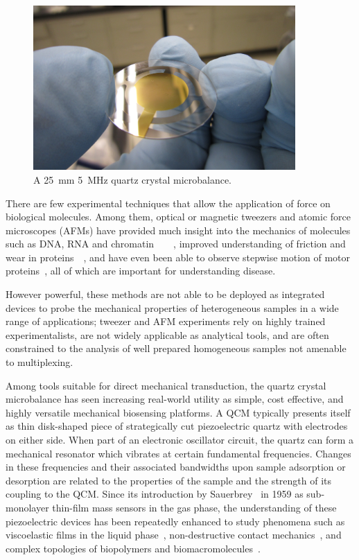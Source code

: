 \begin{figure}[ht]
 \centering
 \includegraphics[keepaspectratio,width=10cm]{qcm/figures/qcm_holding.jpg}
 \caption{A \SI{25}{\milli\meter} \SI{5}{\mega\hertz} quartz crystal microbalance.}
 \label{fig:qcmholding}
\end{figure}
There are few experimental techniques that allow the application of force
on biological molecules. Among them, optical or magnetic tweezers and
atomic force microscopes (AFMs) have provided much insight into the
mechanics of molecules such as DNA, RNA and
chromatin~\cite{felsenfeld1992chromatin}~\cite{cui2000pulling}~\cite{larson2012trigger}~\cite{marko1995stretching},
improved understanding of friction and wear in
proteins~\cite{suda2001origin}~\cite{bormuth2009protein}, and have even
been able to observe stepwise motion of motor
proteins~\cite{asbury2003kinesin}, all of which are important for
understanding disease.

However powerful, these methods are not able to be deployed as integrated
devices to probe the mechanical properties of heterogeneous samples in a
wide range of applications; tweezer and AFM experiments rely on highly
trained experimentalists, are not widely applicable as analytical tools,
and are often constrained to the analysis of well prepared homogeneous
samples not amenable to multiplexing.

Among tools suitable for direct mechanical transduction, the quartz crystal
microbalance has seen increasing real-world utility as simple, cost
effective, and highly versatile mechanical biosensing platforms. A QCM
typically presents itself as thin disk-shaped piece of strategically cut
piezoelectric quartz with electrodes on either side. When part of an
electronic oscillator circuit, the quartz can form a mechanical resonator
which vibrates at certain fundamental frequencies. Changes in these frequencies
and their associated bandwidths upon sample adsorption or desorption are
related to the properties of the sample and the strength of its coupling to
the QCM. Since its introduction by Sauerbrey~\cite{sauerbrey1959verwendung}
in 1959 as sub-monolayer thin-film mass sensors in the gas phase, the
understanding of these piezoelectric devices has been repeatedly enhanced
to study phenomena such as viscoelastic films in the liquid
phase~\cite{kanazawa1985frequency}, non-destructive contact
mechanics~\cite{johannsman2007contacts}, and complex topologies of
biopolymers and biomacromolecules~\cite{marx2003quartz}. 

